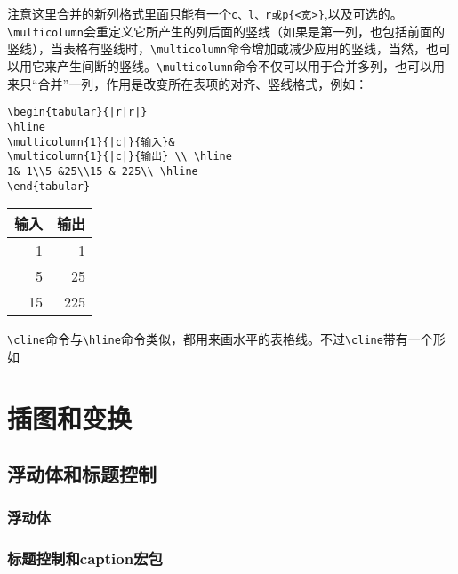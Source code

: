 注意这里合并的新列格式里面只能有一个\verb|c、l、r或p{<宽>}|,以及可选的。\verb|\multicolumn|会重定义它所产生的列后面的竖线（如果是第一列，也包括前面的竖线），当表格有竖线时，\verb|\multicolumn|命令增加或减少应用的竖线，当然，也可以用它来产生间断的竖线。\verb|\multicolumn|命令不仅可以用于合并多列，也可以用来只“合并”一列，作用是改变所在表项的对齐、竖线格式，例如：
\begin{table}[ht]
	\begin{minipage}{0.7\linewidth}
		\begin{lstlisting}
\begin{tabular}{|r|r|}
\hline
\multicolumn{1}{|c|}{输入}&
\multicolumn{1}{|c|}{输出} \\ \hline
1& 1\\5 &25\\15 & 225\\ \hline
\end{tabular}
		\end{lstlisting}
	\end{minipage}
	\quad
	\begin{tabular}{|r|r|}
		\hline
		\multicolumn{1}{|c|}{输入}&
		\multicolumn{1}{|c|}{输出} \\ \hline
		1& 1\\5 &25\\
		15 & 225\\ \hline
	\end{tabular}
\end{table}

\verb|\cline|命令与\verb|\hline|命令类似，都用来画水平的表格线。不过\verb|\cline|带有一个形如
\section{插图和变换}
\subsection{浮动体和标题控制}
\subsubsection{浮动体}
\subsubsection{标题控制和caption宏包}

